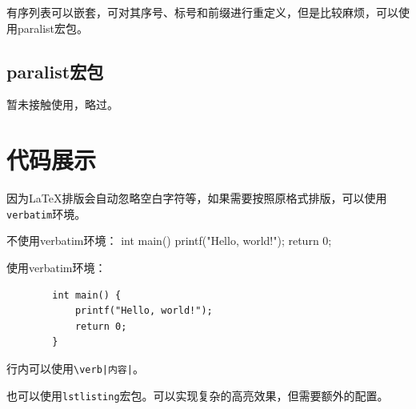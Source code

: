 有序列表可以嵌套，可对其序号、标号和前缀进行重定义，但是比较麻烦，可以使用paralist宏包。


\subsection{paralist宏包}\label{subsec:paralist}

暂未接触使用，略过。

\section{代码展示}\label{sec:codeshow}

因为\LaTeX{}排版会自动忽略空白字符等，如果需要按照原格式排版，可以使用\lstinline{verbatim}环境。


\begin{codeshow}
    不使用verbatim环境：
    int main() {
            printf("Hello, world!");
            return 0;
        }

    使用verbatim环境：
    \begin{verbatim}
        int main() {
            printf("Hello, world!");
            return 0;
        }
    \end{verbatim}
\end{codeshow}

行内可以使用\lstinline{\verb|内容|}。

也可以使用\lstinline{lstlisting}宏包。可以实现复杂的高亮效果，但需要额外的配置。
